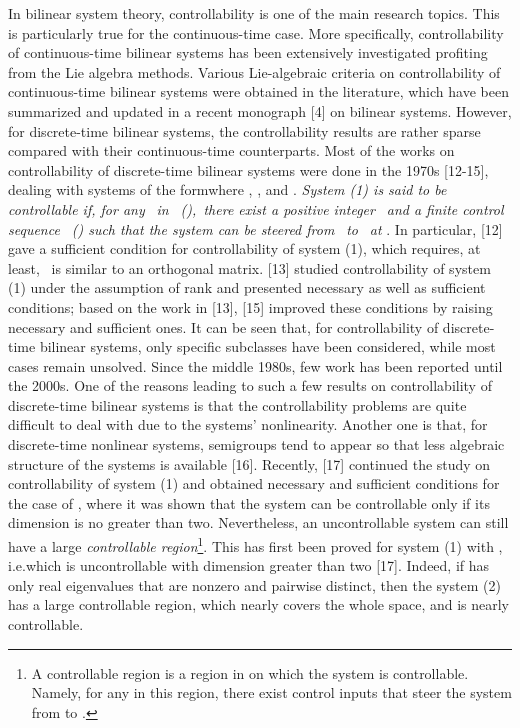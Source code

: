 \documentclass[journal,a4paper,12pt,onecolumn]{IEEEtran}
\begin{document}
In bilinear system theory, controllability is one of the main research
topics. This is particularly true for the continuous-time case. More
specifically, controllability of continuous-time bilinear systems has been
extensively investigated profiting from the Lie algebra methods. Various
Lie-algebraic criteria on controllability of continuous-time bilinear
systems were obtained in the literature, which have been summarized and
updated in a recent monograph [4] on bilinear systems. However, for
discrete-time bilinear systems, the controllability results are rather
sparse compared with their continuous-time counterparts. Most of the works
on controllability of discrete-time bilinear systems were done in the 1970s
[12-15], dealing with systems of the formwhere , , and . \textit{System (1) is said to be controllable if, for any }\textit{\ in }\textit{\ (}\textit{),\ there exist a positive integer }\textit{\ and a finite control sequence }\textit{\ (}\textit{) such that the system can be steered from }\textit{\ to }\textit{\ at }. In particular, [12] gave a sufficient condition
for controllability of system (1), which requires, at least, \ is similar
to an orthogonal matrix. [13] studied controllability of system (1) under
the assumption of rank and presented necessary as well as sufficient
conditions; based on the work in [13], [15] improved these conditions by
raising necessary and sufficient ones. It can be seen that, for
controllability of discrete-time bilinear systems, only specific subclasses
have been considered, while most cases remain unsolved. Since the middle
1980s, few work has been reported until the 2000s. One of the reasons
leading to such a few results on controllability of discrete-time bilinear
systems is that the controllability problems are quite difficult to deal
with due to the systems' nonlinearity. Another one is that, for
discrete-time nonlinear systems, semigroups tend to appear so that less
algebraic structure of the systems is available [16]. Recently, [17]
continued the study on controllability of system (1) and obtained necessary
and sufficient conditions for the case of , where it was shown that
the system can be controllable only if its dimension is no greater than two.
Nevertheless, an uncontrollable system can still have a large \textit{controllable region}\footnote{A controllable region is a region in  on which the system is controllable. Namely, for any  in
this region, there exist control inputs that steer the system from  to
.}. This has first been proved for system (1) with , i.e.which is uncontrollable with dimension greater than two [17]. Indeed, if 
has only real eigenvalues that are nonzero and pairwise distinct, then the
system (2) has a large controllable region, which nearly covers the whole
space, and is nearly controllable.
\end{document}
